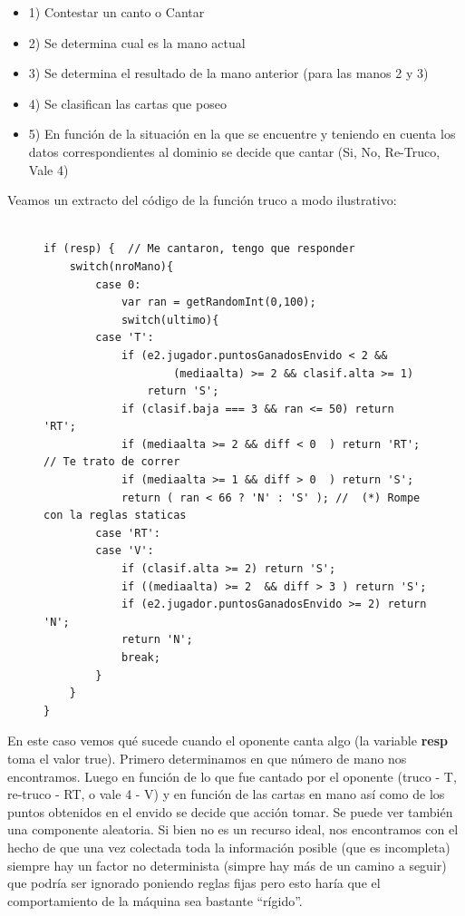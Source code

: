 \documentclass[12pt,a4paper]{article}
\begin{document}
\begin{itemize}
\item 1) Contestar un canto o Cantar
\item 2) Se determina cual es la mano actual
\item 3) Se determina el resultado de la mano anterior (para las manos 2 y 3)
\item 4) Se clasifican las cartas que poseo
\item 5) En funci\'on de la situaci\'on en la que se encuentre y teniendo en cuenta los datos correspondientes al dominio
	   se decide que cantar (Si, No, Re-Truco, Vale 4)
\end{itemize}

Veamos un extracto del c\'odigo de la funci\'on truco a modo ilustrativo:
\begin{figure}[h]
\lstset{language=java,caption=Extracto de la funci\'on truco,label=lst:nicecode}
\begin{lstlisting}

if (resp) {  // Me cantaron, tengo que responder
	switch(nroMano){
		case 0:
			var ran = getRandomInt(0,100);
			switch(ultimo){
		case 'T':
			if (e2.jugador.puntosGanadosEnvido < 2 && 
					(mediaalta) >= 2 && clasif.alta >= 1)
				return 'S';
			if (clasif.baja === 3 && ran <= 50) return 'RT'; 
			if (mediaalta >= 2 && diff < 0  ) return 'RT';  // Te trato de correr
			if (mediaalta >= 1 && diff > 0  ) return 'S';
			return ( ran < 66 ? 'N' : 'S' ); //  (*) Rompe con la reglas staticas
		case 'RT':
		case 'V':
			if (clasif.alta >= 2) return 'S';
			if ((mediaalta) >= 2  && diff > 3 ) return 'S';
			if (e2.jugador.puntosGanadosEnvido >= 2) return 'N';
			return 'N';
			break;
		}
	}
}
\end{lstlisting}
\end{figure}


\noindent En este caso vemos qu\'e sucede cuando el oponente canta algo (la variable \textbf{resp} toma el valor true). Primero determinamos
en que n\'umero de mano nos encontramos. Luego en funci\'on de lo que fue cantado por el oponente (truco - T, re-truco - RT, o vale 4 - V)
y en funci\'on de las cartas en mano as\'i como de los puntos obtenidos en el envido se decide que acci\'on tomar. Se puede ver tambi\'en
una componente aleatoria. Si bien no es un recurso ideal, nos encontramos con el hecho de que una vez colectada toda la informaci\'on posible
(que es incompleta) siempre hay un factor no determinista (simpre hay m\'as de un camino a seguir)
que podr\'ia ser ignorado poniendo reglas fijas pero esto har\'ia que el comportamiento de la m\'aquina sea bastante ``r\'igido''.
\end{document}
